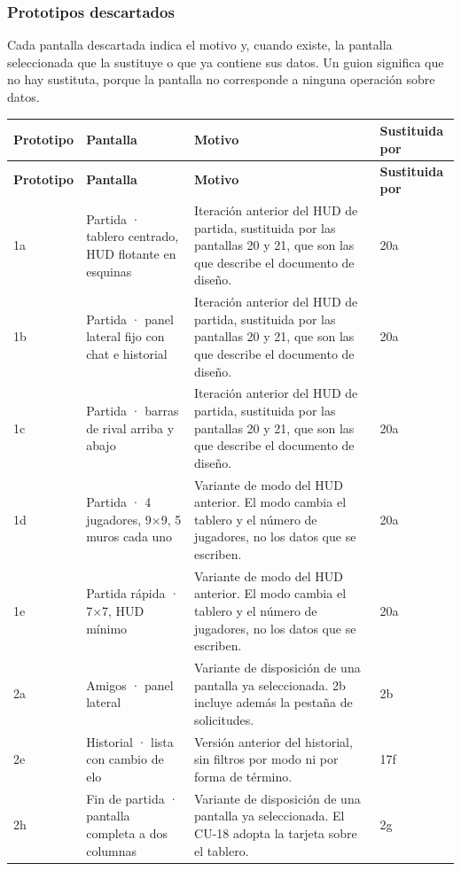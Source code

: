 \subsubsection*{Prototipos descartados}
Cada pantalla descartada indica el motivo y, cuando existe, la pantalla seleccionada que la sustituye o que ya contiene sus datos. Un guion significa que no hay sustituta, porque la pantalla no corresponde a ninguna operación sobre datos.

\begin{center}\small
\begin{longtable}{|L{0.115\textwidth}|L{0.25\textwidth}|L{0.41\textwidth}|L{0.115\textwidth}|}
\hline
\textbf{Prototipo} & \textbf{Pantalla} & \textbf{Motivo} & \textbf{Sustituida por} \\ \hline
\endfirsthead
\hline
\textbf{Prototipo} & \textbf{Pantalla} & \textbf{Motivo} & \textbf{Sustituida por} \\ \hline
\endhead
1a & Partida · tablero centrado, HUD flotante en esquinas & Iteración anterior del HUD de partida, sustituida por las pantallas 20 y 21, que son las que describe el documento de diseño. & 20a \\ \hline
1b & Partida · panel lateral fijo con chat e historial & Iteración anterior del HUD de partida, sustituida por las pantallas 20 y 21, que son las que describe el documento de diseño. & 20a \\ \hline
1c & Partida · barras de rival arriba y abajo & Iteración anterior del HUD de partida, sustituida por las pantallas 20 y 21, que son las que describe el documento de diseño. & 20a \\ \hline
1d & Partida · 4 jugadores, 9×9, 5 muros cada uno & Variante de modo del HUD anterior. El modo cambia el tablero y el número de jugadores, no los datos que se escriben. & 20a \\ \hline
1e & Partida rápida · 7×7, HUD mínimo & Variante de modo del HUD anterior. El modo cambia el tablero y el número de jugadores, no los datos que se escriben. & 20a \\ \hline
2a & Amigos · panel lateral & Variante de disposición de una pantalla ya seleccionada. 2b incluye además la pestaña de solicitudes. & 2b \\ \hline
2e & Historial · lista con cambio de elo & Versión anterior del historial, sin filtros por modo ni por forma de término. & 17f \\ \hline
2h & Fin de partida · pantalla completa a dos columnas & Variante de disposición de una pantalla ya seleccionada. El \mbox{CU-18} adopta la tarjeta sobre el tablero. & 2g \\ \hline

\end{longtable}
\end{center}
